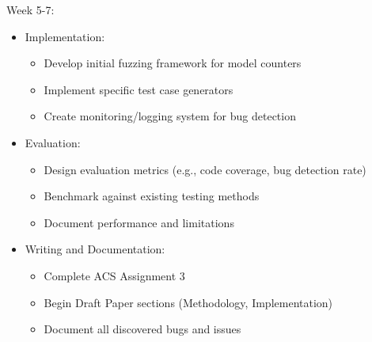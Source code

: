 \documentclass[english, a4paper]{article}
\begin{document}
Week 5-7:
\begin{itemize}
    \item Implementation:
    \begin{itemize}
        \item Develop initial fuzzing framework for model counters
        \item Implement specific test case generators
        \item Create monitoring/logging system for bug detection
    \end{itemize}
    
    \item Evaluation:
    \begin{itemize}
        \item Design evaluation metrics (e.g., code coverage, bug detection rate)
        \item Benchmark against existing testing methods
        \item Document performance and limitations
    \end{itemize}
    
    \item Writing and Documentation:
    \begin{itemize}
        \item Complete ACS Assignment 3
        \item Begin Draft Paper sections (Methodology, Implementation)
        \item Document all discovered bugs and issues
    \end{itemize}
\end{itemize}
\end{document}
